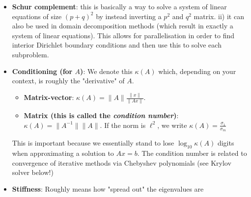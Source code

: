 \begin{itemize}
\item \textbf{Schur complement}: this is basically a way to solve a system of linear equations of size $(p+q)^2$ by instead inverting a $p^2$ and $q^2$ matrix. ii)
it can also be used in domain decomposition methods (which result in exactly a system of linear equations). This allows for parallelisation in order to find
interior Dirichlet boundary conditions and then use this to solve each subproblem.
\item \textbf{Conditioning (for $A$)}: We denote this $\kappa(A)$ which, depending on your context, is roughly the "derivative" of $A$.
\begin{itemize}
\item \textbf{Matrix-vector}: $\kappa(A) = \| A \| \frac{\|x\|}{\| Ax \|}$.
\item \textbf{Matrix (this is called the \emph{condition number})}: $\kappa(A) = \| A^{-1} \| \| A \|$. If the norm is $\ell^2$, we write $\kappa(A) = \frac{\sigma_1}{\sigma_m}$
\end{itemize}
This is important because we essentially stand to lose $\log_{10} \kappa(A)$ digits when approximating a solution to $Ax=b$.
The condition number is related to convergence of iterative methods via Chebyshev polynomials (see Krylov solver below!)

\item \textbf{Stiffness}: Roughly means how "spread out" the eigenvalues are
\end{itemize}

